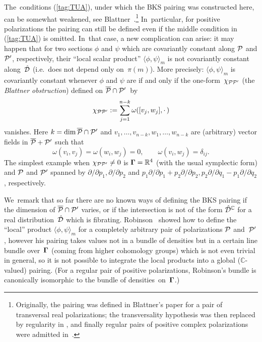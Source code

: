 \documentclass[12pt]{amsart}
\numberwithin{equation}{section}
\theoremstyle{remark}
\newcommand\spr[2]{\langle #1,#2\rangle}
\newcommand\Omg{{\bigam}}   %
\newcommand\PP{{\Cal P}}
\newcommand\DD{{\Cal D}}
\newcommand\GG{{\PP'}}
\newcommand\hatDD{{\hat\DD}}
\newcommand\RR{\mathbb R}
\newcommand{\CC}{\C}
\newcommand{\bigam}{\mbox{\boldmath $\Gamma$}}
\newcommand{\C}{\mathbb C}
\begin{document}
The~conditions (\ref{tag:TUA}), under which the BKS pairing was constructed
here, can be somewhat weakened, see
Blattner~\cite{bib:BlattLN}.\footnote{Originally, the pairing was defined in
Blattner's paper \cite{bib:BlattPSPM} for a pair of transversal real
polarizations; the transversality hypothesis was then replaced by regularity in
\cite{bib:BlattGSPM}, and finally regular pairs of positive complex
polarizations were admitted in~\cite{bib:BlattLN}.} In~particular, for positive
polarizations the pairing can still be defined even if the middle condition
in (\ref{tag:TUA}) is omitted. In~that case, a new complication can arise: it
may happen that for two sections $\phi$ and $\psi$ which are covariantly
constant along $\PP$ and $\GG$, respectively, their ``local scalar product''
$\spr\phi\psi_m$ is not covariantly constant along~$\hatDD$ (i.e.~does not
depend only on~$\pi(m)$). More precisely: $\spr\phi\psi_m$ is covariantly
constant whenever $\phi$ and $\psi$ are if and only if the
one-form~$\chi_{\PP\GG}$ (the {\it Blattner obstruction\/})
defined on $\overline\PP\cap\GG$~by
\begin{equation}  \chi_{\PP\GG} := \sum_{j=1}^{n-k} \omega([v_j,w_j],\cdot\,)
\label{tag:BLOB}  \end{equation}
vanishes. Here $k=\dim\overline\PP\cap\GG$ and $v_1,\dots,v_{n-k},w_1,\dots,
w_{n-k}$ are (arbitrary) vector fields in $\overline\PP+\GG$ such that
$$ \omega(v_i,v_j)=\omega(w_i,w_j)=0, \qquad \omega(v_i,w_j)=\delta_{ij}.  $$
The simplest example when $\chi_{\PP\GG}\neq0$ is $\Omg=\RR^4$ (with the usual
symplectic form) and $\PP$ and $\GG$ spanned by $\partial/\partial p_1,
\partial/\partial p_2$ and $p_1\partial/\partial p_1+p_2 \partial/\partial p_2,
p_2 \partial/\partial q_1-p_1 \partial/\partial q_2$, respectively.

We~remark that so far there are no known ways of defining the BKS pairing if
the dimension of $\overline\PP\cap\GG$ varies, or if the intersection is not of
the form $\hatDD^\CC$ for a real distribution~$\hatDD$ which is fibrating.
Robinson~\cite{bib:RobiTAMS} showed how to define the ``local'' product
$\spr\phi\psi_m$ for a completely arbitrary pair of polarizations $\PP$
and~$\GG$, however his pairing takes values not in a bundle of densities but in
a certain line bundle over~$\Omg$ (coming from higher cohomology groups) which
is not even trivial in general, so it is not possible to integrate the local
products into a global (\hbox{$\CC$-valued}) pairing. (For a regular pair of
positive polarizations, Robinson's bundle is canonically isomorphic to the
bundle of densities~on~$\Omg$.)
\end{document}
